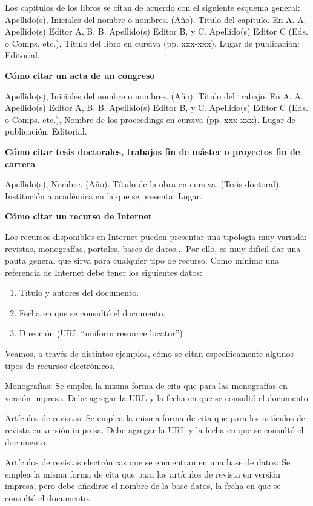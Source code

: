 \documentclass[spanish,12pt, a4paper, twoside]{paper}
\begin{document}
Los capítulos de los libros se citan de acuerdo con el siguiente esquema general:
Apellido(s), Iniciales del nombre o nombres. (Año). Título del capítulo. En A. A. Apellido(s) Editor A, B. B. Apellido(s) Editor B, y C. Apellido(s) Editor C (Eds. o Comps. etc.), Título del libro en cursiva (pp. xxx-xxx). Lugar de publicación: Editorial.

\bigskip
{\bf Cómo citar un acta de un congreso}

Apellido(s), Iniciales del nombre o nombres. (Año). Título del trabajo. En A. A. Apellido(s) Editor A, B. B. Apellido(s) Editor B, y C. Apellido(s) Editor C (Eds. o Comps. etc.), Nombre de los proceedings en cursiva (pp. xxx-xxx). Lugar de publicación: Editorial.

\bigskip
{\bf Cómo citar tesis doctorales, trabajos fin de máster o proyectos fin de carrera}

Apellido(s), Nombre. (Año). Título de la obra en cursiva. (Tesis doctoral). Institución a académica en la que se presenta. Lugar.

\bigskip
{\bf Cómo citar un recurso de Internet}

Los recursos disponibles en Internet pueden presentar una tipología muy variada: revistas, monografías, portales, bases de datos... Por ello, es muy difícil dar una pauta general que sirva para cualquier tipo de recurso.
Como mínimo una referencia de Internet debe tener los siguientes datos:
\begin{enumerate}
\item Título y autores del documento.
\item Fecha en que se consultó el documento.
\item Dirección (URL “uniform resource locator”)
\end{enumerate}

Veamos, a través de distintos ejemplos, cómo se citan específicamente algunos tipos de recursos electrónicos.

Monografías:
Se emplea la misma forma de cita que para las monografías en versión impresa. Debe agregar la URL y la fecha en que se consultó el documento

Artículos de revistas:
Se emplea la misma forma de cita que para los artículos de revista en versión impresa. Debe agregar la URL y la fecha en que se consultó el documento.

Artículos de revistas electrónicas que se encuentran en una base de datos:
Se emplea la misma forma de cita que para los artículos de revista en versión impresa, pero debe añadirse el nombre de la base datos, la fecha en que se consultó el documento.
\end{document}
